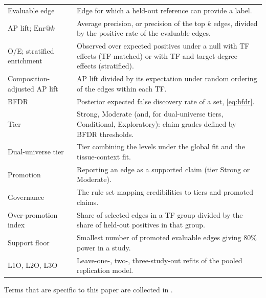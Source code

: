 \documentclass[11pt,a4paper]{article}
\begin{document}
\begin{table}[!t]
\begin{tabular}{@{}p{}p{}@{}}
    Evaluable edge & Edge for which a held-out reference can provide a label. \\
    AP lift; $\mathrm{Enr}@k$ & Average precision, or precision of the top $k$ edges, divided by the positive rate of the evaluable edges. \\
    O/E; stratified enrichment & Observed over expected positives under a null with TF effects (TF-matched) or with TF and target-degree effects (stratified). \\
    Composition-adjusted AP lift & AP lift divided by its expectation under random ordering of the edges within each TF. \\
    BFDR & Posterior expected false discovery rate of a set, \cref{eq:bfdr}. \\
    Tier & Strong, Moderate (and, for dual-universe tiers, Conditional, Exploratory): claim grades defined by BFDR thresholds. \\
    Dual-universe tier & Tier combining the levels under the global fit and the tissue-context fit. \\
    Promotion & Reporting an edge as a supported claim (tier Strong or Moderate). \\
    Governance & The rule set mapping credibilities to tiers and promoted claims. \\
    Over-promotion index & Share of selected edges in a TF group divided by the share of held-out positives in that group. \\
    Support floor & Smallest number of promoted evaluable edges giving 80\% power in a study. \\
    L1O, L2O, L3O & Leave-one-, two-, three-study-out refits of the pooled replication model. \\
    \bottomrule
  \end{tabular}
\end{table}

Terms that are specific to this paper are collected in .
\end{document}
